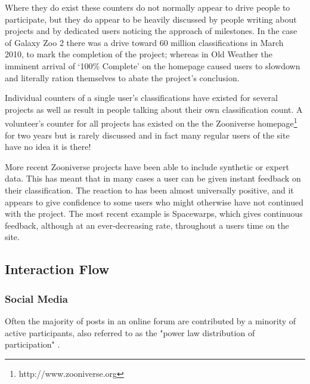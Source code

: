 \documentclass{sigchi}
\begin{document}
Where they do exist these counters do not normally appear to drive people to participate, but they do appear to be heavily discussed by people writing about projects and by dedicated users noticing the approach of milestones. In the case of Galaxy Zoo 2 there was a drive toward 60 million classifications in March 2010, to mark the completion of the project; whereas in Old Weather the imminent arrival of `100\% Complete' on the homepage caused users to slowdown and literally ration themselves to abate the project's conclusion.

Individual counters of a single user's classifications have existed for several projects as well as result in people talking about their own classification count. A volunteer's counter for all projects has existed on the the Zooniverse homepage\footnote{http://www.zooniverse.org} for two years but is rarely discussed and in fact many regular users of the site have no idea it is there!

More recent Zooniverse projects have been able to include synthetic or expert data. This has meant that in many cases a user can be given instant feedback on their classification. The reaction to has been almost universally positive, and it appears to give confidence to some users who might otherwise have not continued with the project. The most recent example is Spacewarps, which gives continuous feedback, although at an ever-decreasing rate, throughout a users time on the site.



\subsection{Interaction Flow}

\subsubsection{Social Media}
Often the majority of posts in an online forum are contributed by a minority of active participants, also referred to as the "power law distribution of participation" \cite{lampe2010motivations}. 
\end{document}
